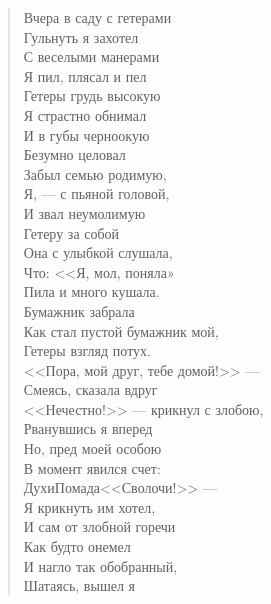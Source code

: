 \newpage
\vspace*{0cm}


\begin{verse}
\begin{altverse}
Вчера в саду с гетерами\\
     Гульнуть я захотел\ldotst\\
С веселыми манерами\\
     Я пил, плясал и пел\ldotst\\
Гетеры грудь высокую\\
     Я страстно обнимал\\
И в губы черноокую\\
     Безумно целовал\ldotst\\
Забыл семью родимую,\\
     Я, --- с пьяной головой,\\
И звал неумолимую\\
     Гетеру за собой\ldotst\\
Она с улыбкой слушала,\\
     Что: <<Я, мол, поняла»\ldotst\\
Пила и много кушала.\\
     Бумажник забрала\ldotst\\
Как стал пустой бумажник мой,\\
     Гетеры взгляд потух.\\
<<Пора, мой друг, тебе домой!>> ---\\
      Смеясь, сказала вдруг\ldotst\\
<<Нечестно!>> --- крикнул с злобою,\\
     Рванувшись я вперед\ldotst\\
Но, пред моей особою\\
     В момент явился счет:\\
Духи\ldotst Помада\ldotst <<Сволочи!>> ---\\
     Я крикнуть им хотел,\\
И сам от злобной горечи\\
     Как будто онемел\ldotst\\
И нагло так обобранный,\\
     Шатаясь, вышел я\ldotst\\

\end{altverse}
\end{verse}
